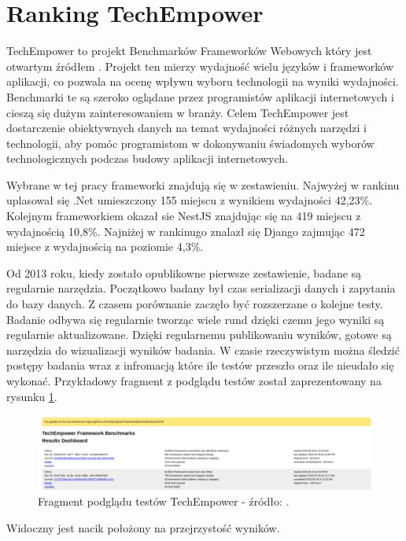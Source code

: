 \section{Ranking TechEmpower}

TechEmpower to projekt Benchmarków Frameworków Webowych który jest otwartym źródłem \cite{techempower}.
Projekt ten mierzy wydajność wielu języków i frameworków aplikacji, co pozwala na ocenę wpływu wyboru technologii na wyniki wydajności.
Benchmarki te są szeroko oglądane przez programistów aplikacji internetowych i cieszą się dużym zainteresowaniem w branży.
Celem TechEmpower jest dostarczenie obiektywnych danych na temat wydajności różnych narzędzi i technologii, aby pomóc programistom w dokonywaniu świadomych wyborów technologicznych podczas budowy aplikacji internetowych.

Wybrane w tej pracy frameworki znajdują się w zestawieniu.
Najwyżej w rankinu uplasował się .Net umieszczony 155 miejscu z wynikiem wydajności 42,23\%.
Kolejnym frameworkiem okazał sie NestJS znajdując się na 419 miejscu z wydajnością 10,8\%.
Najniżej w rankinugo znalazł się Django zajmując 472 miejsce z wydajnością na poziomie 4,3\%. 

Od 2013 roku, kiedy zostało opublikowne pierwsze zestawienie, badane są regularnie narzędzia.
Początkowo badany był czas serializacji danych i zapytania do bazy danych.
Z czasem porównanie zaczęło być rozszerzane o kolejne testy.
Badanie odbywa się regularnie tworząc wiele rund dzięki czemu jego wyniki są regularnie aktualizowane.
Dzięki regularnemu publikowaniu wyników, gotowe są narzędzia do wizualizacji wyników badania.
W czasie rzeczywistym można śledzić postępy badania wraz z infromacją które ile testów przeszło oraz ile nieudało się wykonać.
Przykładowy fragment z podglądu testów został zaprezentowany na rysunku \ref{rys:techempowerdashhboard}.

\begin{figure}[!hb]
	\centering \includegraphics[width=1\linewidth]{rysunki/techempower_result_daschboard.png}
	\caption{Fragment podglądu testów TechEmpower - źródło: \cite{techempower}.}
	\label{rys:techempowerdashhboard}
\end{figure}

Widoczny jest nacik położony na przejrzystość wyników.